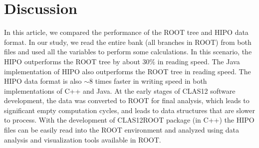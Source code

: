 \documentclass[preprint,12pt]{elsarticle}
\begin{document}

  

 \section{Discussion}
 
 In this article, we compared the performance of the ROOT tree and HIPO data format. In our study, we read the entire bank (all branches in ROOT) from both files and
 used all the variables to perform some calculations. In this scenario, the HIPO outperforms the ROOT tree by about $30\%$ in reading speed. The Java implementation 
 of HIPO also outperforms the ROOT tree in reading speed. The HIPO data format is also $\sim 8$ times faster in writing speed in both implementations of C++ and Java.
 At the early stages of CLAS12 software development, the data was converted to ROOT for final analysis, which leads to significant 
 empty computation cycles, and leads to data structures that are slower to process. With the development of CLAS12ROOT package (in C++)
 the HIPO files can be easily read into the ROOT environment and analyzed using data analysis and visualization tools available in ROOT.
\end{document}
